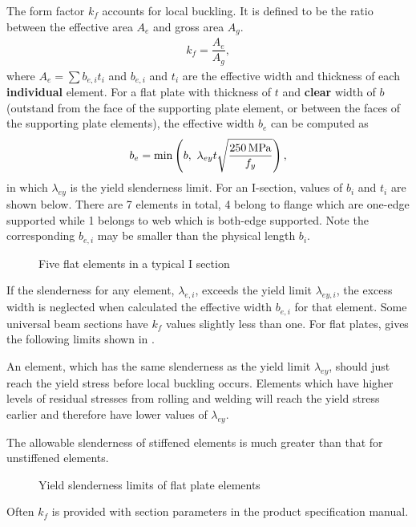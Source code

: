 The form factor $k_f$ accounts for local buckling.
It is defined to be the ratio between the effective area $A_e$ and gross area $A_g$.
\begin{gather*}
k_f=\dfrac{A_e}{A_g},
\end{gather*}
where $A_e=\sum{}b_{e,i}t_i$ and $b_{e,i}$ and $t_i$ are the effective width and thickness of each \textbf{individual} element.
For a flat plate with thickness of $t$ and \textbf{clear} width of $b$ (outstand from the face of the supporting plate element, or between the faces of the supporting plate elements), the effective width $b_e$ can be computed as
\begin{gather}
b_e=\min\left(b,~\lambda_{ey}t\sqrt{\dfrac{\SI{250}{\mega\pascal}}{f_y}}\right),
\end{gather}
in which $\lambda_{ey}$ is the yield slenderness limit.
For an I-section, values of $b_i$ and $t_i$ are shown below.
There are 7 elements in total, 4 belong to flange which are one-edge supported while 1 belongs to web which is both-edge supported.
Note the corresponding $b_{e,i}$ may be smaller than the physical length $b_i$.
\begin{figure}[H]
\centering
\caption{Five flat elements in a typical I section}
\end{figure}

If the slenderness for any element, $\lambda_{e,i}$, exceeds the yield limit $\lambda_{ey,i}$, the excess width is neglected when calculated the effective width $b_{e,i}$ for that element.
Some universal beam sections have $k_f$ values slightly less than one.
For flat plates,  gives the following limits shown in .


An element, which has the same slenderness as the yield limit $\lambda_{ey}$, should just reach the yield stress before local buckling occurs.
Elements which have higher levels of residual stresses from rolling and welding will reach the yield stress earlier and therefore have lower values of $\lambda_{ey}$.

The allowable slenderness of stiffened elements is much greater than that for unstiffened elements.
\begin{figure}[H]
\centering

\caption{Yield slenderness limits of flat plate elements}\label{fig:flat_slenderness}
\end{figure}

Often $k_f$ is provided with section parameters in the product specification manual.

